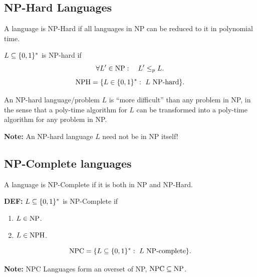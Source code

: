 \subsection{NP-Hard Languages} 

\begin{notesdefinition}
A language is NP-Hard if all languages in NP can be reduced to it in polynomial time.

$L\subseteq\{0,1\}^*$ is NP-hard if
\[
\forall L'\in\mathrm{NP}:\quad L'\leq_p L.
\]
\[
\classNPH=\{L\in\bits^*:\ L\text{ NP-hard}\}.
\]
\end{notesdefinition}

An NP-hard language/problem $L$ is ``more difficult'' than any problem in NP, in the sense that a poly-time algorithm for $L$ can be transformed into a poly-time algorithm for any problem in NP.

\textbf{Note:} An NP-hard language $L$ need not be in NP itself!

\subsection{NP-Complete languages}
A language is NP-Complete if it is both in NP and NP-Hard.

\begin{notesdefinition}
\textbf{DEF:} $L\subseteq\{0,1\}^*$ is NP-Complete if
\begin{enumerate}
\item $L\in\mathrm{NP}$.
\item $L\in\mathrm{NPH}$.
\end{enumerate}
\[
\mathrm{NPC}=\{L\subseteq\{0,1\}^*:\ L\text{ NP-complete}\}.
\]
\end{notesdefinition}

\textbf{Note:} NPC Languages form an overset of NP, $\mathrm{NPC}\subseteq\mathrm{NP}$.
